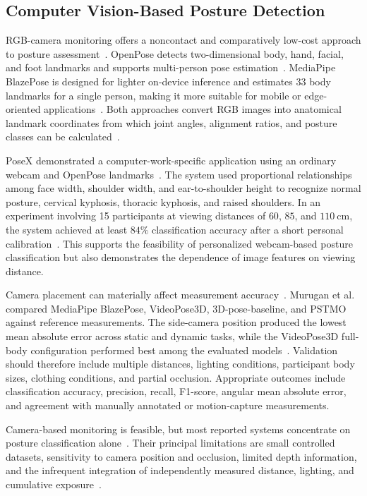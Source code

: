 \subsection{Computer Vision-Based Posture Detection}
RGB-camera monitoring offers a noncontact and comparatively low-cost approach to posture assessment~\cite{ref16,ref19,ref23,ref24}. OpenPose detects two-dimensional body, hand, facial, and foot landmarks and supports multi-person pose estimation~\cite{ref23}. MediaPipe BlazePose is designed for lighter on-device inference and estimates 33 body landmarks for a single person, making it more suitable for mobile or edge-oriented applications~\cite{ref24}. Both approaches convert RGB images into anatomical landmark coordinates from which joint angles, alignment ratios, and posture classes can be calculated~\cite{ref23,ref24}.

PoseX demonstrated a computer-work-specific application using an ordinary webcam and OpenPose landmarks~\cite{ref19}. The system used proportional relationships among face width, shoulder width, and ear-to-shoulder height to recognize normal posture, cervical kyphosis, thoracic kyphosis, and raised shoulders. In an experiment involving 15 participants at viewing distances of $60$, $85$, and $110~\text{cm}$, the system achieved at least $84\%$ classification accuracy after a short personal calibration~\cite{ref19}. This supports the feasibility of personalized webcam-based posture classification but also demonstrates the dependence of image features on viewing distance.

Camera placement can materially affect measurement accuracy~\cite{ref16}. Murugan et al. compared MediaPipe BlazePose, VideoPose3D, 3D-pose-baseline, and PSTMO against reference measurements. The side-camera position produced the lowest mean absolute error across static and dynamic tasks, while the VideoPose3D full-body configuration performed best among the evaluated models~\cite{ref16}. Validation should therefore include multiple distances, lighting conditions, participant body sizes, clothing conditions, and partial occlusion. Appropriate outcomes include classification accuracy, precision, recall, F1-score, angular mean absolute error, and agreement with manually annotated or motion-capture measurements.

Camera-based monitoring is feasible, but most reported systems concentrate on posture classification alone~\cite{ref16,ref17,ref19}. Their principal limitations are small controlled datasets, sensitivity to camera position and occlusion, limited depth information, and the infrequent integration of independently measured distance, lighting, and cumulative exposure~\cite{ref16,ref17,ref19}.

